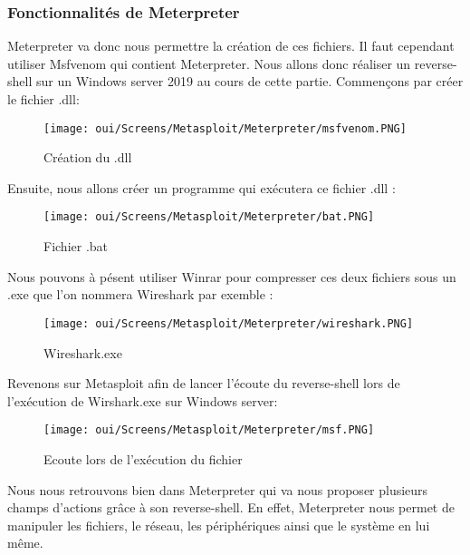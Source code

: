 \subsubsection{Fonctionnalités de Meterpreter}

Meterpreter va donc nous permettre la création de ces fichiers. Il faut cependant utiliser Msfvenom qui contient Meterpreter. Nous allons donc réaliser un reverse-shell sur un Windows server 2019 au cours de cette partie. Commençons par créer le fichier .dll:

\begin{figure}[htp!]
  \centering
  \setlength\figureheight{7cm}
  \setlength\figurewidth{9cm}
  \texttt{[image: oui/Screens/Metasploit/Meterpreter/msfvenom.PNG]}
  \caption{Création du .dll}
  \label{fig:courbe-tikz}
\end{figure}

\newpage
Ensuite, nous allons créer un programme qui exécutera ce fichier .dll :

\begin{figure}[htp!]
  \centering
  \setlength\figureheight{7cm}
  \setlength\figurewidth{9cm}
  \texttt{[image: oui/Screens/Metasploit/Meterpreter/bat.PNG]}
  \caption{Fichier .bat}
  \label{fig:courbe-tikz}
\end{figure}

Nous pouvons à pésent utiliser Winrar pour compresser ces deux fichiers sous un .exe que l'on nommera Wireshark par exemble :

\begin{figure}[htp!]
  \centering
  \setlength\figureheight{7cm}
  \setlength\figurewidth{9cm}
  \texttt{[image: oui/Screens/Metasploit/Meterpreter/wireshark.PNG]}
  \caption{Wireshark.exe}
  \label{fig:courbe-tikz}
\end{figure}

Revenons sur Metasploit afin de lancer l'écoute du reverse-shell lors de l'exécution de Wirshark.exe sur Windows server:

\begin{figure}[htp!]
  \centering
  \setlength\figureheight{7cm}
  \setlength\figurewidth{9cm}
  \texttt{[image: oui/Screens/Metasploit/Meterpreter/msf.PNG]}
  \caption{Ecoute lors de l'exécution du fichier}
  \label{fig:courbe-tikz}
\end{figure}

Nous nous retrouvons bien dans Meterpreter qui va nous proposer plusieurs champs d'actions grâce à son reverse-shell. En effet, Meterpreter nous permet de manipuler les fichiers, le réseau, les périphériques ainsi que le système en lui même. 
